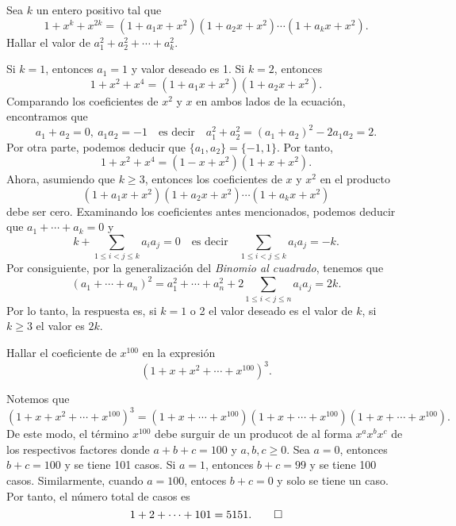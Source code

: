 \begin{example}
    Sea $k$ un entero positivo tal que
    \[
        1 + x^k + x^{2k} = (1 + a_1 x + x^2)(1 + a_2 x + x^2) \cdots (1 + a_k x + x^2).
    \]
    Hallar el valor de $a_1^2 + a_2^2 + \cdots + a_k^2$.
\end{example}
\begin{solution}
    Si $k = 1$, entonces $a_1 = 1$ y valor deseado es 1.
    Si $k = 2$, entonces
    \[
        1 + x^2 + x^4 = (1 + a_1 x + x^2)(1 + a_2 x + x^2).
    \]
    Comparando los coeficientes de $x^2$ y $x$ en ambos lados de la ecuación, encontramos que
    \[
        a_1 + a_2 = 0, \ a_1 a_2 = -1\quad \text{es decir} \quad a_1^2 + a_2^2 = (a_1 + a_2)^2 - 2a_1 a_2 = 2.
    \]
    Por otra parte, podemos deducir que $\{a_1, a_2\} = \{-1, 1\}$.
    Por tanto,
    \[
        1 + x^2 + x^4 = (1 - x + x^2)(1 + x + x^2).
    \]
    Ahora, asumiendo que $k \geq 3$, entonces los coeficientes de $x$ y $x^2$ en el producto
    \[
        (1 + a_1 x + x^2)(1 + a_2 x + x^2) \cdots (1 + a_k x + x^2)
    \]
    debe ser cero.
    Examinando los coeficientes antes mencionados, podemos deducir que
    $a_1 + \cdots + a_k = 0$ y
    \[
        k + \sum_{1 \leq i < j \leq k} a_i a_j = 0 \quad \text{es decir} \quad \sum_{1 \leq i < j \leq k} a_i a_j = -k.
    \]
    Por consiguiente, por la generalización del \textit{Binomio al cuadrado}, tenemos que
    \[
        (a_1 + \cdots + a_n)^2 = a_1^2 + \cdots + a_n^2 + 2 \sum_{1 \leq i < j \leq n} a_i a_j = 2k.
    \]
    Por lo tanto, la respuesta es, si $k = 1$ o 2 el valor deseado es el valor de $k$, si $k \geq 3$ el valor es $2k$.
\end{solution}

\begin{example}
    Hallar el coeficiente de $x^{100}$ en la expresión
    \[
        (1 + x + x^2 + \cdots + x^{100})^3.
    \]
\end{example}
\begin{solution}
    Notemos que
    \[
        (1 + x + x^2 + \cdots + x^{100})^3 = (1 + x + \cdots + x^{100})(1 + x + \cdots + x^{100})(1 + x + \cdots + x^{100}).
    \]
    De este modo, el término $x^{100}$ debe surguir de un producot de al forma $x^a x^b x^c$ de los respectivos factores donde $a + b + c = 100$ y $a,b, c \geq 0$.
    Sea $a = 0$, entonces $b + c = 100$ y se tiene 101 casos.
    Si $a = 1$, entonces $b + c = 99$ y se tiene 100  casos.
    Similarmente, cuando $a = 100$, entoces $b + c = 0$ y solo se tiene un caso.
    Por tanto, el número total de casos es
    \[
        1 + 2 + \cdots + 101 = 5151.\qedhere
    \]
\end{solution}


